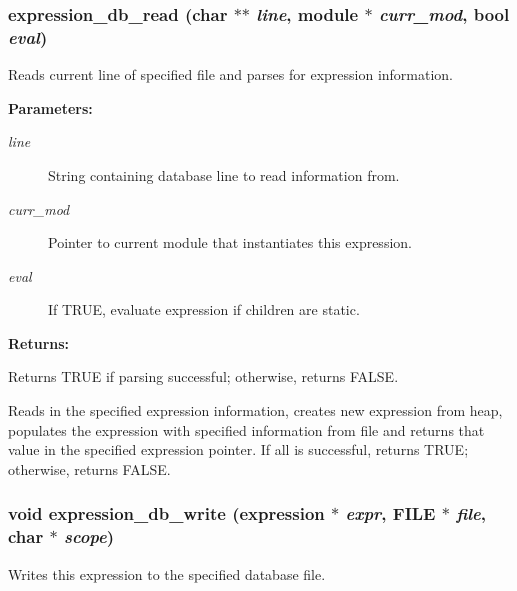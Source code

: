 \subsubsection{ expression\_\-db\_\-read (char $\ast$$\ast$ {\em line}, {\bf module} $\ast$ {\em curr\_\-mod}, {\bf bool} {\em eval})}\label{expr_8c_a16}


Reads current line of specified file and parses for expression information.

\begin{Desc}
\item[{\bf Parameters: }]\par
\begin{description}
\item[
{\em line}]String containing database line to read information from. \item[
{\em curr\_\-mod}]Pointer to current module that instantiates this expression. \item[
{\em eval}]If TRUE, evaluate expression if children are static.

\end{description}
\end{Desc}
\begin{Desc}
\item[{\bf Returns: }]\par
Returns TRUE if parsing successful; otherwise, returns FALSE.

\end{Desc}
Reads in the specified expression information, creates new expression from heap, populates the expression with specified information from file and  returns that value in the specified expression pointer. If all is  successful, returns TRUE; otherwise, returns FALSE. 
\subsubsection{\setlength{\rightskip}{0pt plus 5cm}void expression\_\-db\_\-write ({\bf expression} $\ast$ {\em expr}, FILE $\ast$ {\em file}, char $\ast$ {\em scope})}\label{expr_8c_a15}


Writes this expression to the specified database file.

